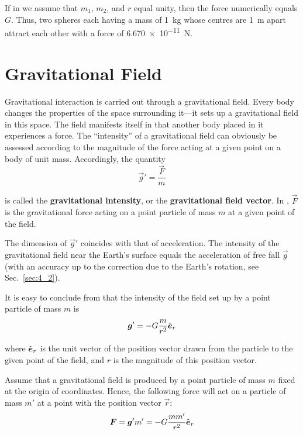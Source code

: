 If in  we assume that $m_1$, $m_2$, and $r$ equal unity, then the force numerically equals $G$. Thus, two spheres each having a mass of \SI{1}{\kilo\gram} whose centres are \SI{1}{\metre} apart attract each other with a force of \SI{6.670e-11}{\newton}.

\section{Gravitational Field}\label{sec:6_2}

Gravitational interaction is carried out through a gravitational field. Every body changes the properties of the space surrounding it---it sets up a gravitational field in this space. The field manifests itself in that another body placed in it experiences a force. The ``intensity'' of a gravitational field can obviously be assessed according to the magnitude of the force acting at a given point on a body of unit mass. Accordingly, the quantity
\begin{equation}\label{eq:6_6}
	\vec{g}' = \frac{\vec{F}}{m}
\end{equation}

\noindent
is called the \textbf{gravitational intensity}, or the \textbf{gravitational field vector}. In , $\vec{F}$ is the gravitational force acting on a point particle of mass $m$ at a given point of the field.

The dimension of $\vec{g}'$ coincides with that of acceleration. The intensity of the gravitational field near the Earth's surface equals the acceleration of free fall $\vec{g}$ (with an accuracy up to the correction due to the Earth's rotation, see Sec.~\ref{sec:4_2}).

It is easy to conclude from  that the intensity of the field set up by a point particle of mass $m$ is
\begin{equation}\label{eq:6_7}
	\boldsymbol{g}' = -G\frac{m}{r^2}\hat{\boldsymbol{e}}_{r}
\end{equation}

\noindent
where $\hat{\boldsymbol{e}}_{r}$ is the unit vector of the position vector drawn from the particle to the given point of the field, and $r$ is the magnitude of this position vector.

Assume that a gravitational field is produced by a point particle of mass $m$ fixed at the origin of coordinates. Hence, the following force will act on a particle of mass $m'$ at a point with the position vector $\vec{r}$:
\begin{equation}\label{eq:6_8}
	\boldsymbol{F} = \boldsymbol{g}'m' = -G\frac{mm'}{r^2}\hat{\boldsymbol{e}}_{r}
\end{equation}

